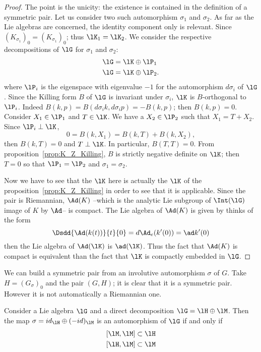 \begin{proof}
The point is the unicity: the existence is contained in the definition of a symmetric pair. Let us consider two such automorphism $\sigma_1$ and $\sigma_2$. As far as the Lie algebras are concerned, the identity component only is relevant. Since $(K_{\sigma_1})_0=(K_{\sigma_1})_0$; thus $\lK_1=\lK_2$. We consider the respective decompositions of $\lG$ for $\sigma_1$ and $\sigma_2$:
\begin{subequations}
\begin{align}
  \lG&=\lK\oplus\lP_1\\
  \lG&=\lK\oplus\lP_2.
\end{align}
\end{subequations}
where $\lP_i$ is the eigenspace with eigenvalue $-1$ for the automorphism $d\sigma_i$ of $\lG$. Since the Killing form $B$ of $\lG$ is invariant under $\sigma_i$, $\lK$ is $B$-orthogonal to $\lP_i$. Indeed $B(k,p)=B(d\sigma_i k,d\sigma_ip)=-B(k,p)$; then $B(k,p)=0$. Consider $X_1\in\lP_1$ and $T\in\lK$. We have a $X_2\in\lP_2$ such that $X_1=T+X_2$. Since $\lP_i\perp\lK$,
\[
  0=B(k,X_1)=B(k,T)+B(k,X_2),
\]
then $B(k,T)=0$ and $T\perp\lK$. In particular, $B(T,T)=0$. From proposition~\ref{prop:K_Z_Killing}, $B$ is strictly negative definite on $\lK$; then $T=0$ so that $\lP_1=\lP_2$ and $\sigma_1=\sigma_2$.

Now we have to see that the $\lK$ here is actually the $\lK$ of the proposition~\ref{prop:K_Z_Killing} in order to see that it is applicable. Since the pair is Riemannian, $\Ad(K)$ --which is the analytic Lie subgroup of $\Int(\lG)$ image of $K$ by $\Ad$-- is compact. The Lie algebra of $\Ad(K)$ is given by thinks of the form
\begin{equation}
  \Dsdd{ \Ad(k(t)) }{t}{0}=d\Ad_e(k'(0))
                          =\ad k'(0)
\end{equation}
then the Lie algebra of $\Ad(\lK)$ is $\ad(\lK)$. Thus the fact that $\Ad(K)$ is compact is equivalent than the fact that $\lK$ is compactly embedded in $\lG$.

\end{proof}

We can build a symmetric pair from an involutive automorphism $\sigma$ of $G$. Take $H=(G_{\sigma})_0$ and the pair $(G,H)$; it is clear that it is a symmetric pair. However it is not automatically a Riemannian one.

\begin{proposition}
Consider a Lie algebra $\lG$ and a direct decomposition $\lG=\lH\oplus\lM$. Then the map $\sigma=id_{\lH}\oplus(-id)_{\lM}$ is an automorphism of $\lG$ if and only if
\begin{subequations}
\begin{align}
  [\lM,\lM]&\subset\lH\\
  [\lH,\lM]&\subset\lM
\end{align}
\end{subequations}
\label{prop:invol_ssi_comm}
\end{proposition}


